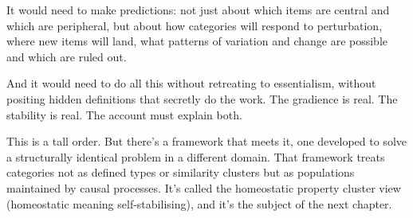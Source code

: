 It would need to make predictions: not just about which items are central and which are peripheral, but about how categories will respond to perturbation, where new items will land, what patterns of variation and change are possible and which are ruled out.

And it would need to do all this without retreating to essentialism, without positing hidden definitions that secretly do the work. The gradience is real. The stability is real. The account must explain both.

This is a tall order. But there's a framework that meets it, one developed to solve a structurally identical problem in a different domain. That framework treats categories not as defined types or similarity clusters but as populations maintained by causal processes. It's called the homeostatic property cluster view (homeostatic meaning self-stabilising), and it's the subject of the next chapter.
